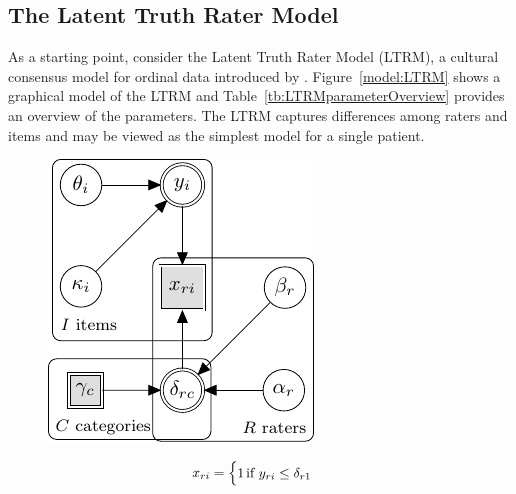 \documentclass[a4paper,usenames,dvipsnames]{article}
\newenvironment{revision}{\color{teal}}{\color{black}}
\begin{document}
\subsection*{The Latent Truth Rater Model}
As a starting point, consider the Latent Truth Rater Model (LTRM), a cultural consensus model for ordinal data introduced by \AB{}. Figure~\ref{model:LTRM} shows a graphical model of the LTRM \begin{revision}and Table~\ref{tb:LTRMparameterOverview} provides an overview of the parameters\end{revision}. The LTRM captures differences among raters and items and may be viewed as the simplest model for a single patient.
\begin{figure}[!ht]
	\begin{minipage}{0.5\textwidth}
		\centering
		\includegraphics[width=\textwidth, page=7]{graphicalModels/graphicalModels.pdf}
		\end{minipage}\hfill
	\begin{minipage}{0.5\textwidth}
		{\normalsize
		\begin{align*}
			x_{\Irater\Iitem} &\assignment
			\begin{cases}
			1		&\hspace{-.3cm} \text{if } \Appraisal_{\Irater\Iitem} \leq \Threshold_{\Irater 1} \\

\end{cases}
\end{align*}}
\end{minipage}
\end{figure}
\end{document}
